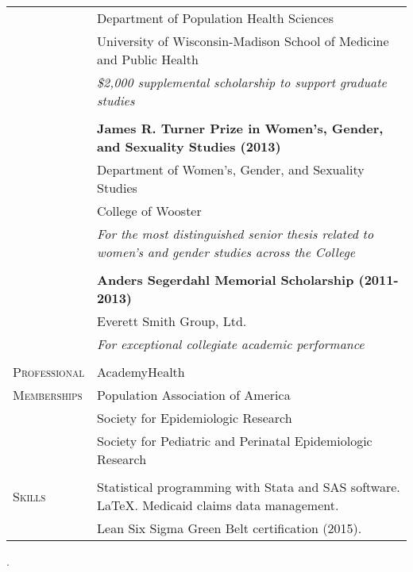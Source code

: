 \documentclass[letterpaper,10pt,oneside]{article}
\begin{document}
\begin{longtable}{@{} p{} p{}}
     & Department of Population Health Sciences \\
     & University of Wisconsin-Madison School of Medicine and Public Health \\
     & \textit{\$2,000 supplemental scholarship to support graduate studies} \\
     & \\
     &\textbf{James R. Turner Prize in Women's, Gender, and Sexuality Studies (2013)} \\
     & Department of Women's, Gender, and Sexuality Studies \\
     & College of Wooster \\
     & \textit{For the most distinguished senior thesis related to women's and gender studies across the College} \\
     & \\
     &\textbf{Anders Segerdahl Memorial Scholarship (2011-2013)} \\
     & Everett Smith Group, Ltd. \\
     & \textit{For exceptional collegiate academic performance} \\
     & \\
\textsc{Professional} & AcademyHealth \\
\textsc{Memberships} & Population Association of America \\
     & Society for Epidemiologic Research \\
     & Society for Pediatric and Perinatal Epidemiologic Research \\
     & \\
\textsc{Skills} & Statistical programming with Stata and SAS software. \LaTeX. Medicaid claims data management. \\
     & Lean Six Sigma Green Belt certification (2015).\\
\end{longtable}. 
\end{document}
